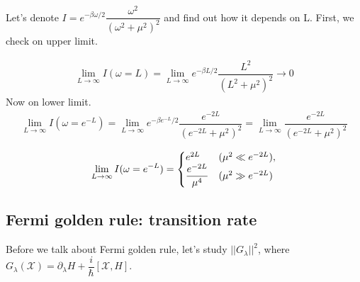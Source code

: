 \documentclass[11pt,a4paper]{article}
\begin{document}
Let's denote $I=e^{-\beta \omega/2} \dfrac{\omega^2}{(\omega^2 + \mu^2)^2}$ and find out how it depends on L. First, we check on upper limit.

\begin{align*}
\lim_{L \rightarrow \infty}I(\omega=L)=\lim_{L \rightarrow \infty} e^{-\beta L/2} \dfrac{L^2}{(L^2 + \mu^2)^2} \rightarrow 0
\end{align*}
Now on lower limit.
\begin{align*}
\lim_{L \rightarrow \infty}I(\omega=e^{-L})=\lim_{L \rightarrow \infty} e^{-\beta e^{-L}/2} \dfrac{e^{-2L}}{(e^{-2L} + \mu^2)^2}=\lim_{L \rightarrow \infty} \dfrac{e^{-2L}}{(e^{-2L} + \mu^2)^2}
\end{align*}

\begin{equation}
  \lim_{L \rightarrow \infty}I(\omega=e^{-L})=\left\{
  \begin{array}{@{}ll@{}}
    e^{2L} & (\mu^2 \ll e^{-2L}), \\
     \dfrac{e^{-2L}}{ \mu^4} & (\mu^2 \gg e^{-2L})
  \end{array}\right.
\end{equation}

\subsection{Fermi golden rule: transition rate}
Before we talk about Fermi golden rule, let's study  $||   G_{\lambda}||^2$, where $G_{\lambda}(\mathcal{X} )= \partial_{\lambda} H + \dfrac{i}{\hbar} [\mathcal{X}, H] $.
\end{document}
